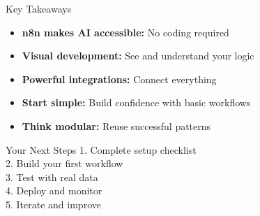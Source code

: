 \documentclass{beamer}
\begin{document}
\begin{frame}{Key Takeaways}
  \begin{itemize}
    \item \textbf{n8n makes AI accessible:} No coding required
    \item \textbf{Visual development:} See and understand your logic
    \item \textbf{Powerful integrations:} Connect everything
    \item \textbf{Start simple:} Build confidence with basic workflows
    \item \textbf{Think modular:} Reuse successful patterns
  \end{itemize}
  
  \vspace{0.5cm}
  
  \begin{block}{Your Next Steps}
    1. Complete setup checklist\\
    2. Build your first workflow\\
    3. Test with real data\\
    4. Deploy and monitor\\
    5. Iterate and improve
  \end{block}
\end{frame}
\end{document}
